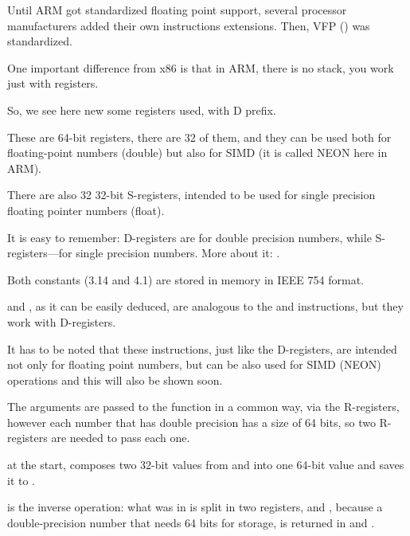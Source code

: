 
Until ARM got standardized floating point support, several processor manufacturers added their own 
instructions extensions.
Then,  VFP () was standardized.

One important difference from x86 is that in ARM, there
is no stack, you work just with registers.




So, we see here new some registers used, with D prefix.

These are 64-bit registers, there are 32 of them, and they can be used both for floating-point numbers 
(double) but also for SIMD (it is called NEON here in ARM).

There are also 32 32-bit S-registers, intended to be used for single precision 
floating pointer numbers (float).

It is easy to remember: D-registers are for double precision numbers, while
S-registers---for single precision numbers.
More about it: .

Both constants (3.14 and 4.1) are stored in memory in IEEE 754 format.

 and , as it can be easily deduced, are analogous to the  and \MOV instructions,
but they work with D-registers.

It has to be noted that these instructions, just like the D-registers, are intended not only for
floating point numbers, 
but can be also used for SIMD (NEON) operations and this will also be shown soon.

The arguments are passed to the function in a common way, via the R-registers, however
each number that has double precision has a size of 64 bits, so two R-registers are needed to pass each one.

 at the start, composes two 32-bit values from  and  into one 64-bit value
and saves it to .

 is the inverse operation: what was in  
is split in two registers,  and , because a double-precision number 
that needs 64 bits for storage, is returned in  and .

